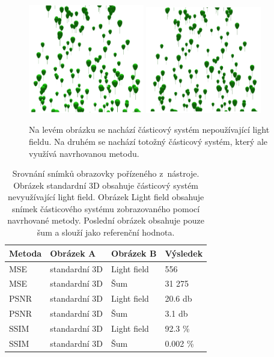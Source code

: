 \begin{figure}[H]
	\centering
	\includegraphics[width=0.45\textwidth]{obrazky-figures/nolightfield.png}
	\hspace*{1cm}
	\includegraphics[width=0.45\textwidth]{obrazky-figures/lightfield.png}
	\caption{Na levém obrázku se nachází částicový systém nepoužívající light fieldu. Na druhém se nachází totožný částicový systém, který ale využívá navrhovanou metodu. }
	\label{fig:comp_particles}
\end{figure}

\begin{center}
\begin{table}[h!]
\centering
\begin{tabular}{|l|l|l|l|}
\hline
\textbf{Metoda} & \textbf{Obrázek A} & \textbf{Obrázek B} & \textbf{Výsledek} \\ 
\hline
MSE & standardní 3D & Light field & 556 \\
MSE & standardní 3D & Šum & 31 275 \\
PSNR & standardní 3D & Light field & 20.6 db \\
PSNR & standardní 3D & Šum  & 3.1 db \\
SSIM & standardní 3D & Light field & 92.3 \% \\
SSIM & standardní 3D & Šum  & 0.002 \% \\
\hline
\end{tabular}
\label{tab:psnr_comp}
 \caption{Srovnání snímků obrazovky pořízeného z~nástroje. Obrázek standardní 3D obsahuje částicový systém nevyužívající light field. Obrázek Light field obsahuje snímek částicového systému zobrazovaného pomocí navrhované metody. Poslední obrázek obsahuje pouze šum a slouží jako referenční hodnota.}
\end{table}
\end{center}
